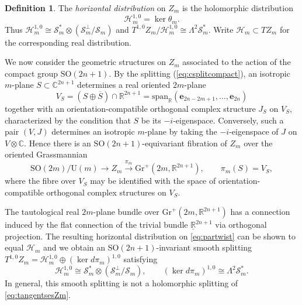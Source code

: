\documentclass[11pt]{article}
\theoremstyle{definition}
\newtheorem{definition}[theorem]{Definition}
\newcommand{\R}{\mathbb{R}}
\newcommand{\C}{\mathbb{C}}
\newcommand{\SO}{\mathrm{SO}}
\newcommand{\U}{\mathrm{U}}
\numberwithin{equation}{section}
\begin{document}
\begin{definition}
	The \emph{horizontal distribution} on $Z_m$ is the holomorphic distribution
	\begin{equation*}
		\mathcal H_m^{1,0} = \ker\theta_m.
	\end{equation*}
	Thus $\mathcal H_m^{1,0} \cong \mathcal S_m^* \otimes (\mathcal{S}_m^{\perp} / \mathcal{S}_m)$ and $T^{1,0} Z_m /\mathcal{H}_m^{1,0} \cong \Lambda^2\mathcal S_m^*$. Write $\mathcal H_m\subset TZ_m$ for the corresponding real distribution.
\end{definition}

We now consider the geometric structures on $Z_m$ associated to the action of the compact group $\SO(2n+1)$. By the splitting (\ref{eq:csplitcompact}), an isotropic $m$-plane $S\subset\C^{2n+1}$ determines a real oriented $2m$-plane
\begin{equation*}
	V_S=(S \oplus \overline{S})\cap\R^{2n+1} = \mathrm{span}_\R(\mathbf{e}_{2n-2m + 1}, \ldots, \mathbf{e}_{2n})
\end{equation*}
together with an orientation-compatible orthogonal complex structure $J_S$ on $V_S$, characterized by the condition that $S$ be its $-i$-eigenspace. Conversely, such a pair $(V,J)$ determines an isotropic $m$-plane by taking the $-i$-eigenspace of $J$ on $V \otimes \C.$ Hence there is an $\SO(2n+1)$-equivariant fibration of $Z_m$ over the oriented Grassmannian
\begin{equation}\label{eq:partwist}
	\SO(2m)/\U(m) \longrightarrow Z_m \xrightarrow{\pi_m} \mathrm{Gr}^+(2m,\R^{2n+1}), \qquad \pi_m(S)=V_S,
\end{equation}
where the fibre over $V_S$ may be identified with the space of orientation-compatible orthogonal complex structures on $V_S.$ 
    
The tautological real $2m$-plane bundle over $\mathrm{Gr}^+(2m,\R^{2n+1})$ has a connection induced by the flat connection of the trivial bundle $\underline{\R}^{2n+1}$ via orthogonal projection. The resulting horizontal distribution on \eqref{eq:partwist} can be shown to equal $\mathcal{H}_m$ and we obtain an $\SO(2n+1)$-invariant smooth splitting $T^{1,0}Z_m = \mathcal{H}_m^{1,0} \oplus (\ker d\pi_m)^{1,0}$ satisfying
\begin{equation*}
	\mathcal{H}_m^{1,0} \cong \mathcal{S}_m^* \otimes (\mathcal{S}_m^{\perp} / \mathcal{S}_m), \qquad (\ker d\pi_m)^{1,0} \cong \Lambda^2\mathcal S_m^*.
\end{equation*}
In general, this smooth splitting is not a holomorphic splitting of \eqref{eq:tangentsesZm}.
\end{document}
